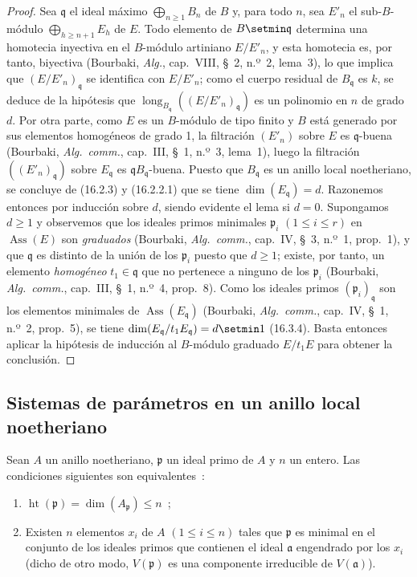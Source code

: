 \begin{proof}
Sea $\mathfrak{q}$ el ideal máximo $\bigoplus_{n\geq1}B_n$ de $B$ y, para todo
$n$, sea $E'_n$ el sub-$B$-módulo $\bigoplus_{h\geq n+1}E_h$ de $E$. Todo
elemento de $B\setmin\mathfrak{q}$ determina una homotecia inyectiva en el
$B$-módulo artiniano $E/E'_n$, y esta homotecia es, por tanto, biyectiva
(Bourbaki, \emph{Alg.}, cap.~VIII, \S~2, n.º~2, lema~3), lo que implica que
$(E/E'_n)_{\mathfrak{q}}$ se identifica con $E/E'_n$; como el cuerpo residual
de $B_{\mathfrak{q}}$ es $k$, se deduce de la hipótesis que
$\operatorname{long}_{B_{\mathfrak{q}}}((E/E'_n)_{\mathfrak{q}})$ es un
polinomio en $n$ de grado $d$. Por otra parte, como $E$ es un $B$-módulo de
tipo finito y $B$ está generado por sus elementos homogéneos de grado 1, la
filtración $(E'_n)$ sobre $E$ es $\mathfrak{q}$-buena (Bourbaki,
\emph{Alg.~comm.}, cap.~III, \S~1, n.º~3, lema~1), luego la filtración
$((E'_n)_{\mathfrak{q}})$ sobre $E_{\mathfrak{q}}$ es
$\mathfrak{q}B_{\mathfrak{q}}$-buena. Puesto que $B_{\mathfrak{q}}$ es un
anillo local noetheriano, se concluye de (16.2.3) y (16.2.2.1) que se tiene
$\dim(E_{\mathfrak{q}})=d$. Razonemos entonces por inducción sobre $d$, siendo
evidente el lema si $d=0$. Supongamos $d\geq1$ y observemos que los ideales
primos minimales $\mathfrak{p}_i$ $(1\leq i\leq r)$ en
$\operatorname{Ass}(E)$ son \emph{graduados} (Bourbaki, \emph{Alg.~comm.},
cap.~IV, \S~3, n.º~1, prop.~1), y que $\mathfrak{q}$ es distinto de la unión
de los $\mathfrak{p}_i$ puesto que $d\geq1$; existe, por tanto, un elemento
\emph{homogéneo} $t_1\in\mathfrak{q}$ que no pertenece a ninguno de los
$\mathfrak{p}_i$ (Bourbaki, \emph{Alg.~comm.}, cap.~III, \S~1, n.º~4,
prop.~8). Como los ideales primos $(\mathfrak{p}_i)_{\mathfrak{q}}$ son los
elementos minimales de $\operatorname{Ass}(E_{\mathfrak{q}})$ (Bourbaki,
\emph{Alg.~comm.}, cap.~IV, \S~1, n.º~2, prop.~5), se tiene
$\dim(E_{\mathfrak{q}}/t_1E_{\mathfrak{q}})=d\setmin 1$ (16.3.4). Basta entonces
aplicar la hipótesis de inducción al $B$-módulo graduado $E/t_1E$ para obtener
la conclusión.
\end{proof}
\subsection{Sistemas de parámetros en un anillo local noetheriano}
\label{subsection:0.16.3-fr}

\begin{proposition}[16.3.1]
\label{0.16.3.1-fr}
Sean $A$ un anillo noetheriano, $\mathfrak{p}$ un ideal primo de $A$ y $n$ un
entero. Las condiciones siguientes son equivalentes~:
\begin{enumerate}
  \item[\textup{a)}] $\operatorname{ht}(\mathfrak{p})=
  \dim(A_{\mathfrak{p}})\leq n$~;
  \item[\textup{b)}] Existen $n$ elementos $x_i$ de $A$ $(1\leq i\leq n)$ tales que
  $\mathfrak{p}$ es minimal en el conjunto de los ideales primos que contienen
  el ideal $\mathfrak{a}$ engendrado por los $x_i$ \textup{(dicho de otro modo,}
  $V(\mathfrak{p})$ es una componente irreducible de $V(\mathfrak{a})$).
\end{enumerate}
\end{proposition}

